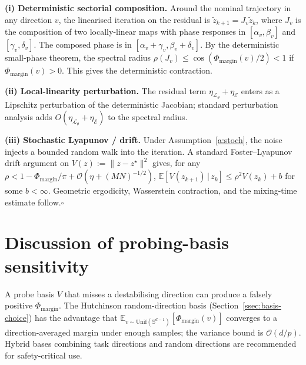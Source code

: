 \documentclass[11pt,a4paper]{article}
\theoremstyle{definition}
\theoremstyle{remark}
\newcommand{\E}{\mathbb{E}}
\newcommand{\agent}{\mathcal{L}_{\theta}}
\newcommand{\env}{\mathcal{E}}
\newcommand{\PhaseMargin}{\Phi_{\mathrm{margin}}}
\begin{document}
\textbf{(i) Deterministic sectorial composition.}
Around the nominal trajectory in any direction $v$, the
linearised iteration on the residual is
$\widetilde z_{k+1}=J_{v}\widetilde z_{k}$, where $J_{v}$ is the
composition of two locally-linear maps with phase responses in
$[\alpha_{v},\beta_{v}]$ and $[\gamma_{v},\delta_{v}]$.  The composed
phase is in $[\alpha_{v}+\gamma_{v},\beta_{v}+\delta_{v}]$.  By the
deterministic small-phase theorem, the spectral radius
$\rho(J_{v})\le\cos(\PhaseMargin(v)/2)<1$ if
$\PhaseMargin(v)>0$.  This gives the deterministic contraction.

\textbf{(ii) Local-linearity perturbation.}  The residual term
$\eta_{\agent}+\eta_{\env}$ enters as a Lipschitz perturbation of the
deterministic Jacobian; standard perturbation analysis adds
$O(\eta_{\agent}+\eta_{\env})$ to the spectral radius.

\textbf{(iii) Stochastic Lyapunov / drift.}  Under
Assumption~\ref{a:stoch}, the noise injects a bounded random walk into
the iteration.  A standard Foster--Lyapunov drift argument
\citep{MeynTweedie} on $V(z) := \|z-z^{\star}\|^{2}$ gives, for any
$\rho<1-\PhaseMargin/\pi+\mathcal{O}(\eta+(MN)^{-1/2})$,
$\E[V(z_{k+1})\,|\,z_{k}]\le \rho^{2}V(z_{k})+b$ for some
$b<\infty$.  Geometric ergodicity, Wasserstein contraction, and the
mixing-time estimate follow.\hfill$\square$

\section{Discussion of probing-basis sensitivity}\label{app:basis}

A probe basis $V$ that misses a destabilising direction can produce a
falsely positive $\PhaseMargin$.  The Hutchinson random-direction
basis (Section~\ref{ssec:basis-choice}) has the advantage that
$\E_{v\sim\mathrm{Unif}(\mathbb{S}^{d-1})}[\PhaseMargin(v)]$ converges to a
direction-averaged margin under enough samples; the variance bound is
$\mathcal{O}(d/p)$.  Hybrid bases combining task directions and random
directions are recommended for safety-critical use.



\end{document}
